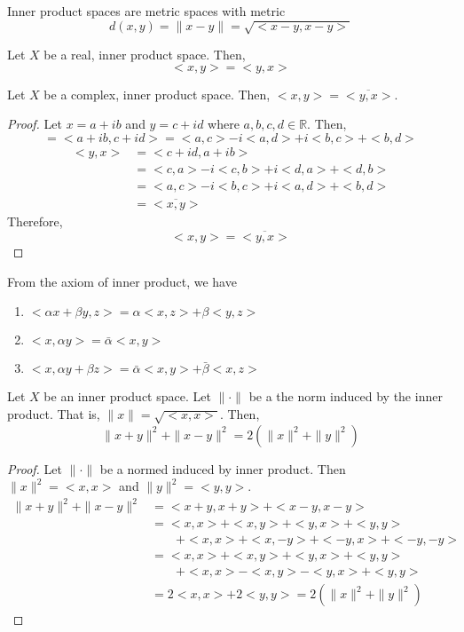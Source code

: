 \begin{remark}
	Inner product spaces are metric spaces with metric 
	\[ d(x,y) = \|x-y\| = \sqrt{<x-y,x-y>} \]
\end{remark}
\begin{remark}
	Let $X$ be a real, inner product space.
	Then, 
	\[ <x,y> = <y,x> \]
\end{remark}
\begin{remark}
	Let $X$ be a complex, inner product space.
	Then, $<x,y> = \overline{<y,x>}$.
\end{remark}
\begin{proof}
	Let $x = a+ib$ and $y = c+id$ where $a,b,c,d \in \mathbb{R}$.
	Then,
	\[<x,y> = <a+ib,c+id> = <a,c> -i<a,d> + i<b,c> + <b,d> \]
	\begin{align*}
		<y,x> 
		& = <c+id,a+ib> \\
		& = <c,a> -i<c,b> + i<d,a> + <d,b> \\
		& = <a,c> -i<b,c> + i<a,d> + <b,d> \\
		& = \overline{<x,y>}
	\end{align*}
	Therefore,
	\[ <x,y> = \overline{<y,x>} \]
\end{proof}
\begin{remark}
	From the axiom of inner product, we have
	\begin{enumerate}
		\item $ <\alpha x + \beta y, z > = \alpha<x,z> + \beta<y,z>$
		\item $<x,\alpha y> = \bar{\alpha}<x,y>$
		\item $<x,\alpha y+\beta z> = \bar{\alpha}<x,y> + \bar{\beta}<x,z>$
	\end{enumerate}
\end{remark}

\begin{lemma}
	Let $X$ be an inner product space.
	Let $\|\cdot\|$ be a the norm induced by the inner product.
	That is, $\|x\| = \sqrt{<x,x>}$.
	Then,
	\[ \| x+y \|^2 + \| x-y \|^2 = 2(\|x\|^2+\|y\|^2) \]
\end{lemma}
\begin{proof}
	Let $\|\cdot\|$ be a normed induced by inner product.
	Then $\|x\|^2 = <x,x>$ and $\|y\|^2 = <y,y>$.
	\begin{align*}
		\|x+y\|^2+\|x-y\|^2 
		& = <x+y,x+y> + <x-y,x-y> \\
		& = <x,x> + <x,y> + <y,x> + <y,y> \\
		& \qquad + <x,x> + <x,-y> + <-y,x> + <-y,-y> \\
		& = <x,x> + <x,y> + <y,x> + <y,y> \\
		& \qquad + <x,x> - <x,y> - <y,x> + <y,y> \\
		& = 2<x,x> + 2<y,y> = 2(\|x\|^2+\|y\|^2)
	\end{align*}
\end{proof}

